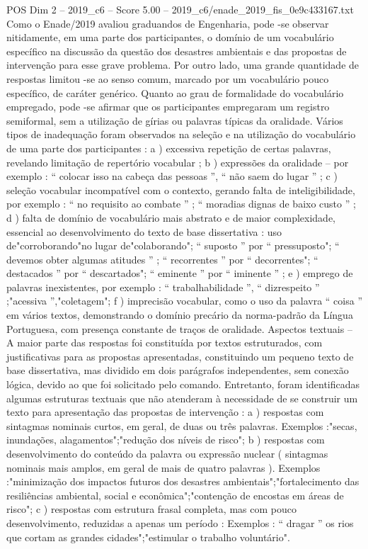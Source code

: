 \begin{textsample}{POS Dim 2 – 2019\_c6 – Score 5.00 – 2019\_c6/enade\_2019\_fis\_0e9c433167.txt}
Como o Enade/2019 avaliou graduandos de Engenharia, pode -se observar nitidamente, em uma parte dos participantes, o domínio de um vocabulário específico na discussão da questão dos desastres ambientais e das propostas de intervenção para esse grave problema.
Por outro lado, uma grande quantidade de respostas limitou -se ao senso comum, marcado por um vocabulário pouco específico, de caráter genérico.
Quanto ao grau de formalidade do vocabulário empregado, pode -se afirmar que os participantes empregaram um registro semiformal, sem a utilização de gírias ou palavras típicas da oralidade.
Vários tipos de inadequação foram observados na seleção e na utilização do vocabulário de uma parte dos participantes : a ) excessiva repetição de certas palavras, revelando limitação de repertório vocabular ; b ) expressões da oralidade – por exemplo : “ colocar isso na cabeça das pessoas ”, “ não saem do lugar ” ; c ) seleção vocabular incompatível com o contexto, gerando falta de inteligibilidade, por exemplo : “ no requisito ao combate ” ; “ moradias dignas de baixo custo ” ; d ) falta de domínio de vocabulário mais abstrato e de maior complexidade, essencial ao desenvolvimento do texto de base dissertativa : uso de"corroborando"no lugar de"colaborando"; “ suposto ” por “ pressuposto"; “ devemos obter algumas atitudes ” ; “ recorrentes ” por “ decorrentes"; “ destacados ” por “ descartados"; “ eminente ” por “ iminente ” ; e ) emprego de palavras inexistentes, por exemplo : “ trabalhabilidade ”, “ dizrespeito ” ;"acessiva ”,"coletagem"; f ) imprecisão vocabular, como o uso da palavra “ coisa ” em vários textos, demonstrando o domínio precário da norma-padrão da Língua Portuguesa, com presença constante de traços de oralidade.
Aspectos textuais – A maior parte das respostas foi constituída por textos estruturados, com justificativas para as propostas apresentadas, constituindo um pequeno texto de base dissertativa, mas dividido em dois parágrafos independentes, sem conexão lógica, devido ao que foi solicitado pelo comando.
Entretanto, foram identificadas algumas estruturas textuais que não atenderam à necessidade de se construir um texto para apresentação das propostas de intervenção : a ) respostas com sintagmas nominais curtos, em geral, de duas ou três palavras.
Exemplos :"secas, inundações, alagamentos";"redução dos níveis de risco"; b ) respostas com desenvolvimento do conteúdo da palavra ou expressão nuclear ( sintagmas nominais mais amplos, em geral de mais de quatro palavras ).
Exemplos :"minimização dos impactos futuros dos desastres ambientais";"fortalecimento das resiliências ambiental, social e econômica";"contenção de encostas em áreas de risco"; c ) respostas com estrutura frasal completa, mas com pouco desenvolvimento, reduzidas a apenas um período : Exemplos : “ dragar ” os rios que cortam as grandes cidades";"estimular o trabalho voluntário".

\end{textsample}
